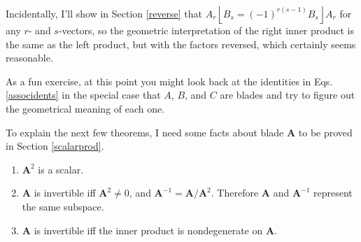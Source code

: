 \documentclass{utarticle}
\newcommand{\bl}[1]{\ensuremath{\bm{#1}}}
\DeclareMathOperator{\lin}{\rfloor}
\DeclareMathOperator{\rin}{\lfloor}
\begin{document}
Incidentally, I'll show in Section \ref{reverse} that $A_r \rin B_s = 
(-1)^{r(s-1)} B_s \lin A_r$ for any $r$- and $s$-vectors, so the geometric 
interpretation of the right inner product is the same as the left product, but 
with the factors reversed, which certainly seems reasonable.

As a fun exercise, at this point you might look back at the identities in Eqs.~
\eqref{associdents} in the special case that $A$, $B$, and $C$ are blades and try 
to figure out the geometrical meaning of each one.

To explain the next few theorems, I need some facts about blade \bl{A} to be 
proved in Section \ref{scalarprod}.
\begin{enumerate}
\item $\bl{A}^2$ is a scalar.
\item \bl{A} is invertible iff $\bl{A}^2 \neq 0$, and $\bl{A}^{-1}=\bl{A}/\bl{A}^2$.  
Therefore \bl{A} and $\bl{A}^{-1}$ represent the same subspace.
\item \bl{A} is invertible iff the inner product is nondegenerate on \bl{A}.
\end{enumerate}
\end{document}
